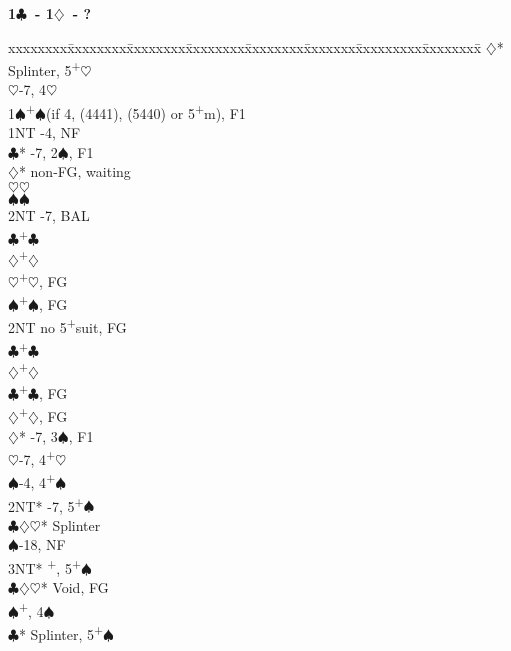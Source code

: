 \documentclass[10pt]{article}
\renewcommand{\c}{$\clubsuit$}
\renewcommand{\d}{$\diamondsuit$}
\newcommand{\h}{$\heartsuit$}
\newcommand{\s}{$\spadesuit$}
\newcommand{\p}{\textsuperscript{+}}
\newcommand{\m}{\textsuperscript{\textminus}}
\newenvironment{bidtable}[1][]
{\textbf{#1}
  \begin{adjustwidth}{1em}{}
    \addvspace{2pt}
    \begin{tabbing}
      xxxxxxxx\=xxxxxxxx\=xxxxxxxx\=xxxxxxxx\=xxxxxxxx\=xxxxxxx\=xxxxxxxxx\=xxxxxxxx\=\kill}
{\end{tabbing}\end{adjustwidth}\bigskip}%
\begin{document}
\begin{bidtable}[1\c\ - 1\d\ - ?]
     \d* \> Splinter, 5\p\h                    \\
     \h  {}-7, 4\h                           \\
1\s  {}\p\s (if 4, (4441), (5440) or 5\p m), F1  \\
     \> 1NT  -4, NF                            \\
     \c* {}-7, 2\m\s, F1                     \\
     \>      \d*     \> non-FG, waiting        \\
     \>      \>          \h {}\h             \\
     \>      \>          \s {}\s             \\
     \>      \>          \> 2NT -7, BAL        \\
     \>      \>          \c {}\p\c           \\
     \>      \>          \d {}\p\d           \\
     \>      \h      {}\p\h, FG              \\
     \>      \s      {}\p\s, FG              \\
     \>      \> 2NT      \> no 5\p suit, FG        \\
     \>      \>          \c {}\p\c           \\
     \>      \>          \d {}\p\d           \\
     \>      \c      {}\p\c, FG              \\%
     \>      \d      {}\p\d, FG              \\
     \d* {}-7, 3\s, F1                       \\
     \h  {}-7, 4\p\h                         \\
     \s  {}-4, 4\p\s                         \\
     \> 2NT* -7, 5\p\s                         \\
     \>      \c\d\h* \> Splinter               \\
     \>      \s      {}-18, NF              \\
     \>      \> 3NT*     \p, 5\p\s            \\
     \>      \c\d\h* \> Void, FG               \\
     \>      \s      {}\p, 4\s              \\
     \c* \> Splinter, 5\p\s                    \\

\end{bidtable}
\end{document}
